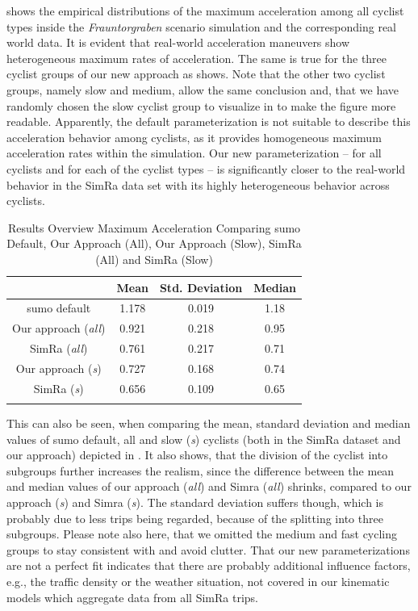  shows the empirical distributions of the maximum acceleration among all cyclist types inside the \textit{Frauntorgraben} scenario simulation and the corresponding real world data.
It is evident that real-world acceleration maneuvers show heterogeneous maximum rates of acceleration.
The same is true for the three cyclist groups of our new approach as  shows.
Note that the other two cyclist groups, namely slow and medium, allow the same conclusion and, that we have randomly chosen the slow cyclist group to visualize in  to make the figure more readable.
Apparently, the default parameterization is not suitable to describe this acceleration behavior among cyclists, as it provides homogeneous maximum acceleration rates within the simulation.
Our new parameterization -- for all cyclists and for each of the cyclist types -- is significantly closer to the real-world behavior in the SimRa data set with its highly heterogeneous behavior across cyclists.
\begin{table}
\centering
\caption{Results Overview Maximum Acceleration Comparing \ac{sumo} Default, Our Approach (All), Our Approach (Slow), SimRa (All) and SimRa (Slow)}%
\label{tab:results_overview_acc}
\begin{tabular}{cccc}
\toprule
& Mean & Std. Deviation & Median\\
\midrule
\midrule
\ac{sumo} default & \num{1.178} & \num{0.019} & \num{1.18} \\
\midrule
Our approach (\textit{all}) & \num{0.921} & \num{0.218} & \num{0.95} \\
SimRa (\textit{all}) & \num{0.761} & \num{0.217} & \num{0.71} \\
\midrule
Our approach (\textit{s}) & \num{0.727} & \num{0.168} & \num{0.74} \\
SimRa (\textit{s}) & \num{0.656} & \num{0.109} & \num{0.65} \\
\bottomrule&
\end{tabular}
\end{table}
This can also be seen, when comparing the mean, standard deviation and median values of \ac{sumo} default, all and slow (\textit{s}) cyclists (both in the SimRa dataset and our approach) depicted in .
It also shows, that the division of the cyclist into subgroups further increases the realism, since the difference between the mean and median values of our approach (\textit{all}) and Simra (\textit{all}) shrinks, compared to our approach (\textit{s}) and Simra (\textit{s}).
The standard deviation suffers though, which is probably due to less trips being regarded, because of the splitting into three subgroups.
Please note also here, that we omitted the medium and fast cycling groups to stay consistent with  and avoid clutter.
That our new parameterizations are not a perfect fit indicates that there are probably additional influence factors, e.g., the traffic density or the weather situation, not covered in our kinematic models which aggregate data from all SimRa trips.

